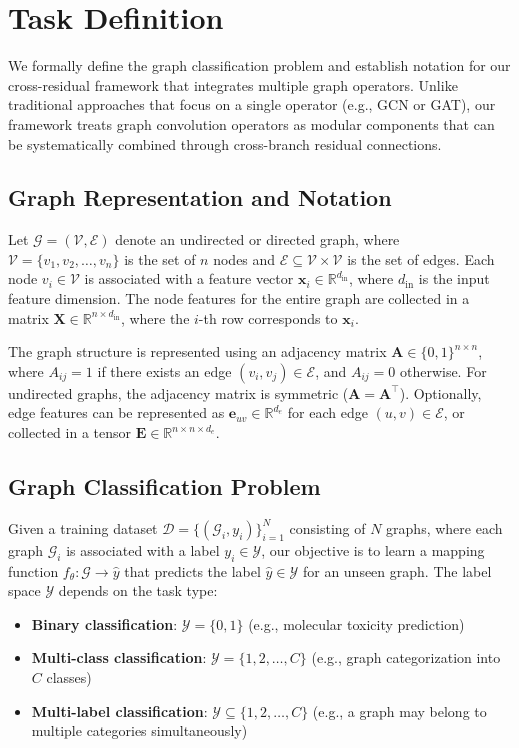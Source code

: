 \section{Task Definition}
\label{sec:task}

We formally define the graph classification problem and establish notation for our cross-residual framework that integrates multiple graph operators. Unlike traditional approaches that focus on a single operator (e.g., GCN or GAT), our framework treats graph convolution operators as modular components that can be systematically combined through cross-branch residual connections.

\subsection{Graph Representation and Notation}

Let $\mathcal{G} = (\mathcal{V}, \mathcal{E})$ denote an undirected or directed graph, where $\mathcal{V} = \{v_1, v_2, \ldots, v_n\}$ is the set of $n$ nodes and $\mathcal{E} \subseteq \mathcal{V} \times \mathcal{V}$ is the set of edges. Each node $v_i \in \mathcal{V}$ is associated with a feature vector $\mathbf{x}_i \in \mathbb{R}^{d_{\text{in}}}$, where $d_{\text{in}}$ is the input feature dimension. The node features for the entire graph are collected in a matrix $\mathbf{X} \in \mathbb{R}^{n \times d_{\text{in}}}$, where the $i$-th row corresponds to $\mathbf{x}_i$.

The graph structure is represented using an adjacency matrix $\mathbf{A} \in \{0,1\}^{n \times n}$, where $A_{ij} = 1$ if there exists an edge $(v_i, v_j) \in \mathcal{E}$, and $A_{ij} = 0$ otherwise. For undirected graphs, the adjacency matrix is symmetric ($\mathbf{A} = \mathbf{A}^\top$). Optionally, edge features can be represented as $\mathbf{e}_{uv} \in \mathbb{R}^{d_e}$ for each edge $(u,v) \in \mathcal{E}$, or collected in a tensor $\mathbf{E} \in \mathbb{R}^{n \times n \times d_e}$.

\subsection{Graph Classification Problem}

Given a training dataset $\mathcal{D} = \{(\mathcal{G}_i, y_i)\}_{i=1}^{N}$ consisting of $N$ graphs, where each graph $\mathcal{G}_i$ is associated with a label $y_i \in \mathcal{Y}$, our objective is to learn a mapping function $f_\theta: \mathcal{G} \rightarrow \hat{y}$ that predicts the label $\hat{y} \in \mathcal{Y}$ for an unseen graph. The label space $\mathcal{Y}$ depends on the task type:
\begin{itemize}
    \item \textbf{Binary classification}: $\mathcal{Y} = \{0, 1\}$ (e.g., molecular toxicity prediction)
    \item \textbf{Multi-class classification}: $\mathcal{Y} = \{1, 2, \ldots, C\}$ (e.g., graph categorization into $C$ classes)
    \item \textbf{Multi-label classification}: $\mathcal{Y} \subseteq \{1, 2, \ldots, C\}$ (e.g., a graph may belong to multiple categories simultaneously)
\end{itemize}

